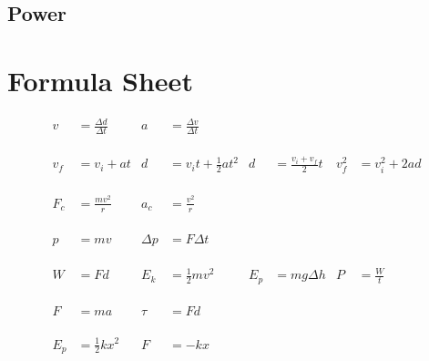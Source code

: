\documentclass{report}
\begin{document}
\newpage
\section{Power}

\appendix

\chapter{Formula Sheet}

\begin{align*}
    v &= \frac{\Delta d}{\Delta t} & a &= \frac{\Delta v}{\Delta t} \\ \\ \\ \\
    v_{f} &= v_{i}+at & d &= v_{i}t + \frac{1}{2}at^{2} & d &= \frac{v_{i} + v_{f}}{2}t & v_f^{2} &= v_{i}^{2} + 2ad \\ \\ \\ \\
    F_{c} &= \frac{mv^{2}}{r} & a_{c} &= \frac{v^{2}}{r} \\ \\ \\ \\
    p &= mv & \Delta p &= F\Delta t\\ \\ \\ \\
    W &= Fd & E_{k} &= \frac{1}{2}mv^{2} & E_{p} &= mg\Delta h & P &= \frac{W}{t} \\ \\ \\ \\
    F &=ma & \tau &= Fd \\ \\ \\ \\
    E_{p} &= \frac{1}{2}kx^{2} & F &= -kx
\end{align*}
\end{document}
